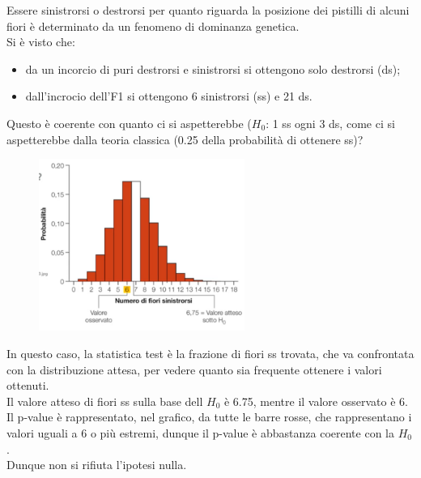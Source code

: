 \documentclass[10pt, draft]{book}
\newcommand{\tightlist}{%
\setlength{\itemsep}{1pt}\setlength{\parskip}{0pt}\setlength{\parsep}{0pt}}
\newcounter{example}[section]
\begin{document}
\begin{example}
    Essere sinistrorsi o destrorsi per quanto riguarda la posizione dei pistilli di alcuni fiori è determinato da un fenomeno di dominanza genetica.
    \\
    Si è visto che:
    \begin{itemize} \tightlist
        \item da un incorcio di puri destrorsi e sinistrorsi si ottengono solo destrorsi (ds);
        \item dall'incrocio dell'F1 si ottengono 6 sinistrorsi (ss) e 21 ds.
    \end{itemize}
    Questo è coerente con quanto ci si aspetterebbe ($H_0$: 1 ss ogni 3 ds, come ci si aspetterebbe dalla teoria classica (0.25 della probabilità di ottenere ss)?
    \begin{figure}[H]\label{fig6.4-1}
    \centering
    \includegraphics[width=0.6\textwidth]{fig6.4-1}
    \caption{\small{}}
    \end{figure}
In questo caso, la statistica test è la frazione di fiori ss trovata, che va confrontata con la distribuzione attesa, per vedere quanto sia frequente ottenere i valori ottenuti.
\\
Il valore atteso di fiori ss sulla base dell $H_0$ è 6.75, mentre il valore osservato è 6.
\\
Il p-value è rappresentato, nel grafico, da tutte le barre rosse, che rappresentano i valori uguali a 6 o più estremi, dunque il p-value è abbastanza coerente con la $H_0$.
\\
Dunque non si rifiuta l'ipotesi nulla.
\end{example}
\clearpage
\end{document}
